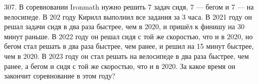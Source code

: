 307. В соревновании Ironmath нужно решить 7 задач сидя, 7 --- бегом и 7 --- на велосипеде. В 202 году Кирилл выполнил все задания за 3 часа. В 2021 году он решал задачи сидя в два раза быстрее, чем в 2020, и пришёл к финишу на 30 минут раньше. В 2022 году он решал сидя с той же скоростью, что и в 2020, но бегом стал решать в два раза быстрее, чем ранее, и решил на 15 минут быстрее, чем в 2020. В 2023 году он стал решать на велосипеде в два раза быстрее, чем ранее, а бегом и сидя с той же скоростью, что и в 2020. За какое время он закончит соревнование в этом году?\\

